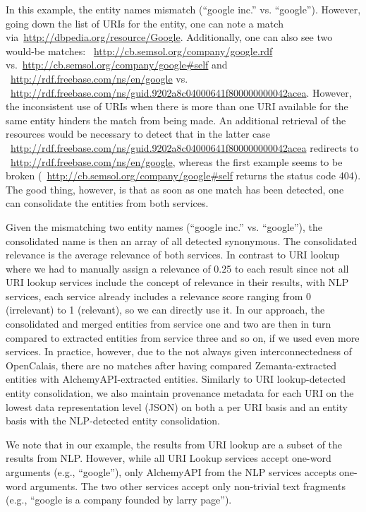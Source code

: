 \documentclass[twocolumn]{article}
\newcommand{\nofootnote}[1]{~#1}
\begin{document}
In this example, the entity names mismatch (``google inc.'' vs. ``google''). However, going down the list of URIs for
the entity, one can note a match via\nofootnote{\url{http://dbpedia.org/resource/Google}}. Additionally, one can also
see two would-be matches: \nofootnote{\url{http://cb.semsol.org/company/google.rdf}}
vs.\nofootnote{\url{http://cb.semsol.org/company/google#self}} and
\nofootnote{\url{http://rdf.freebase.com/ns/en/google}} vs.
\nofootnote{\url{http://rdf.freebase.com/ns/guid.9202a8c04000641f800000000042acea}}. However, the inconsistent use of
URIs when there is more than one URI available for the same entity hinders the match from being made. An additional
retrieval of the resources would be necessary to detect that in the latter case
\nofootnote{\url{http://rdf.freebase.com/ns/guid.9202a8c04000641f800000000042acea}} redirects to
\nofootnote{\url{http://rdf.freebase.com/ns/en/google}}, whereas the first example seems to be broken
(\nofootnote{\url{http://cb.semsol.org/company/google#self}} returns the status code 404). The good thing, however, is
that as soon as one match has been detected, one can consolidate the entities from both services.

Given the mismatching two entity names (``google inc.'' vs. ``google''), the consolidated name is then an array of all
detected synonymous. The consolidated relevance is the average relevance of both services. In contrast to URI lookup
where we had to manually assign a relevance of 0.25 to each result since not all URI lookup services include the
concept of relevance in their results, with NLP services, each service already includes a relevance score ranging from
0 (irrelevant) to 1 (relevant), so we can directly use it. In our approach, the consolidated and merged entities from
service one and two are then in turn compared to extracted entities from service three and so on, if we used even more
services. In practice, however, due to the not always given interconnectedness of OpenCalais, there are no matches
after having compared Zemanta-extracted entities with AlchemyAPI-extracted entities. Similarly to URI lookup-detected
entity consolidation, we also maintain provenance metadata for each URI on the lowest data representation level (JSON)
on both a per URI basis and an entity basis with the NLP-detected entity consolidation.

We note that in our example, the results from URI lookup are a subset of the results from NLP. However, while all URI
Lookup services accept one-word arguments (e.g., ``google''), only AlchemyAPI from the NLP services accepts one-word
arguments. The two other services accept only non-trivial text fragments (e.g., ``google is a company founded by larry
page'').
\end{document}
